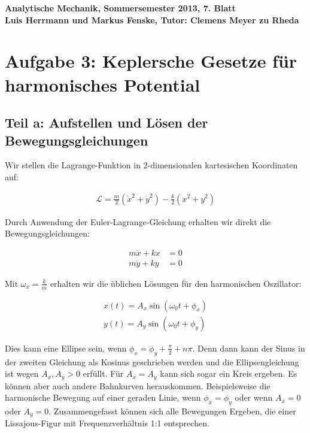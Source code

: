 \documentclass[a4paper,german,12pt,smallheadings]{scrartcl}
\begin{document}
\begin{center}
\bfseries %
\sffamily %
\vspace{-40pt}
Analytische Mechanik, Sommersemester 2013, 7. Blatt \\
Luis Herrmann und Markus Fenske, Tutor: Clemens Meyer zu Rheda
\vspace{-10pt}
\end{center}
\section*{Aufgabe 3: Keplersche Gesetze für harmonisches Potential}
\subsection*{Teil a: Aufstellen und Lösen der Bewegungsgleichungen}
Wir stellen die Lagrange-Funktion in 2-dimensionalen kartesischen Koordinaten
auf:

\begin{align*}
  \mathcal{L} = \frac{m}{2}(\dot{x}^2 + \dot{y}^2) - \frac{k}{2}(x^2 + y^2)
\end{align*}

Durch Anwendung der Euler-Lagrange-Gleichung erhalten wir direkt die
Bewegungsgleichungen:

\begin{align*}
  m\ddot{x} + kx &= 0\\
  m\ddot{y} + ky &= 0
\end{align*}

Mit $\omega_{x} = \frac{k}{m}$ erhalten wir die üblichen Lösungen für den
harmonischen Oszillator:

\begin{align*}
  x(t) = A_x \sin(\omega_0 t + \phi_x) \\
  y(t) = A_y \sin(\omega_0 t + \phi_y)
\end{align*}

Dies kann eine Ellipse sein, wenn $\phi_x = \phi_y + \frac{\pi}{2} + n\pi$.
Denn dann kann der Sinus in der zweiten Gleichung als Kosinus geschrieben
werden und die Ellipsengleichung ist wegen $A_x, A_y > 0$ erfüllt. Für $A_x =
A_y$ kann sich sogar ein Kreis ergeben. Es können aber auch andere Bahnkurven
herauskommen. Beispielsweise die harmonische Bewegung auf einer geraden Linie,
wenn $\phi_x = \phi_y$ oder wenn $A_x = 0$ oder $A_y = 0$. Zusammengefasst
können sich alle Bewegungen Ergeben, die einer Lissajous-Figur mit
Frequenzverhältnis 1:1 entsprechen.
\end{document}
